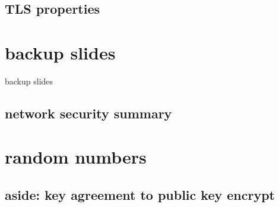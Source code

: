 \subsection{TLS properties}




\usetikzlibrary{circuits.logic.mux}







\section{backup slides}
\begin{frame}{backup slides}
\end{frame}
\subsection{network security summary}


\section{random numbers}

\subsection{aside: key agreement to public key encrypt}




